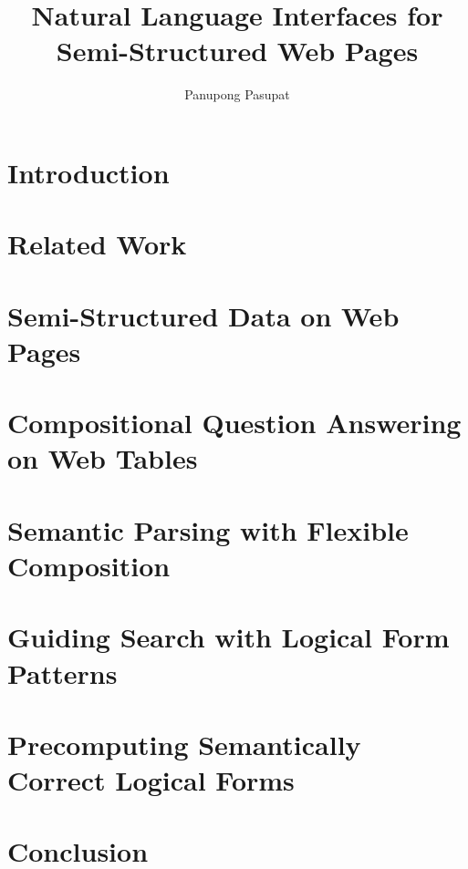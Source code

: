 \documentclass{report}
\begin{document}
\title{Natural Language Interfaces for Semi-Structured Web Pages}
\author{Panupong Pasupat}
 
\beforepreface


\afterpreface

\chapter{Introduction}
\label{chp:intro}


\chapter{Related Work}
\label{chp:related}


\chapter{Semi-Structured Data on Web Pages}
\label{chp:semi}


\chapter{Compositional Question Answering on Web Tables}
\label{chp:tables}


\chapter{Semantic Parsing with Flexible Composition}
\label{chp:parsing}


\chapter{Guiding Search with Logical Form Patterns}
\label{chp:macro}


\chapter{Precomputing Semantically Correct Logical Forms}
\label{chp:dpd}


\chapter{Conclusion}
\label{chp:conclusion}


\appendix



\end{document}
